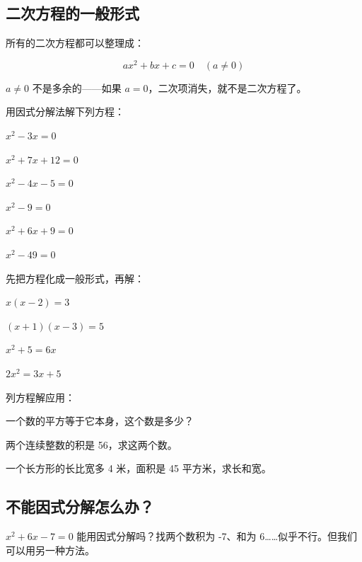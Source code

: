 \subsection*{二次方程的一般形式}

所有的二次方程都可以整理成：

\[
ax^2 + bx + c = 0 \quad (a \neq 0)
\]

$a\neq0$ 不是多余的——如果 $a=0$，二次项消失，就不是二次方程了。

\begin{exercise}
\item 用因式分解法解下列方程：
  \begin{subexercise}
    \item $x^2 - 3x = 0$
    \item $x^2 + 7x + 12 = 0$
    \item $x^2 - 4x - 5 = 0$
    \item $x^2 - 9 = 0$
    \item $x^2 + 6x + 9 = 0$
    \item $x^2 - 49 = 0$
  \end{subexercise}

\item 先把方程化成一般形式，再解：
  \begin{subexercise}
    \item $x(x-2) = 3$
    \item $(x+1)(x-3) = 5$
    \item $x^2 + 5 = 6x$
    \item $2x^2 = 3x + 5$
  \end{subexercise}

\item 列方程解应用：
  \begin{subexercise}
    \item 一个数的平方等于它本身，这个数是多少？
    \item 两个连续整数的积是 56，求这两个数。
    \item 一个长方形的长比宽多 4 米，面积是 45 平方米，求长和宽。
  \end{subexercise}
\end{exercise}


\subsection*{不能因式分解怎么办？}

$x^2 + 6x - 7 = 0$ 能用因式分解吗？找两个数积为 -7、和为 6……似乎不行。但我们可以用另一种方法。

